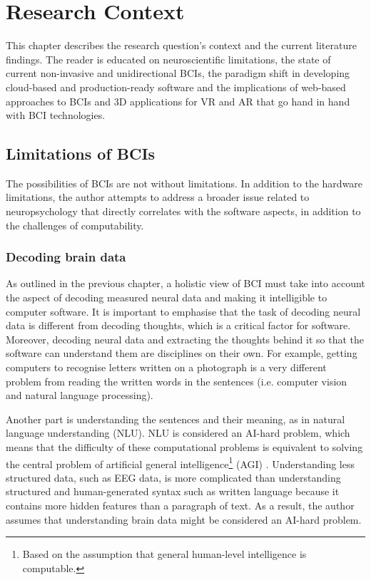 \chapter{Research Context}
\graphicspath{{Chapter2/Figs/}{Chapter2/Figs/}}

This chapter describes the research question's context and the current literature findings. The reader is educated on neuroscientific limitations, the state of current non-invasive and unidirectional BCIs, the paradigm shift in developing cloud-based and production-ready software and the implications of web-based approaches to BCIs and 3D applications for VR and AR that go hand in hand with BCI technologies.

\section{Limitations of BCIs}
\label{chapter2-limitations-of-bcis}

The possibilities of BCIs are not without limitations. In addition to the hardware limitations, the author attempts to address a broader issue related to neuropsychology that directly correlates with the software aspects, in addition to the challenges of computability.

\subsection{Decoding brain data}
\label{chapter2-decoding-brain-data}

As outlined in the previous chapter, a holistic view of BCI must take into account the aspect of decoding measured neural data and making it intelligible to computer software. It is important to emphasise that the task of decoding neural data is different from decoding thoughts, which is a critical factor for software. Moreover, decoding neural data and extracting the thoughts behind it so that the software can understand them are disciplines on their own. For example, getting computers to recognise letters written on a photograph is a very different problem from reading the written words in the sentences (i.e. computer vision and natural language processing).

Another part is understanding the sentences and their meaning, as in natural language understanding (NLU). NLU is considered an AI-hard problem, which means that the difficulty of these computational problems is equivalent to solving the central problem of artificial general intelligence\footnote{Based on the assumption that general human-level intelligence is computable.} (AGI) \citep{demasi_theoretical_2010}. Understanding less structured data, such as EEG data, is more complicated than understanding structured and human-generated syntax such as written language because it contains more hidden features than a paragraph of text. As a result, the author assumes that understanding brain data might be considered an AI-hard problem.

